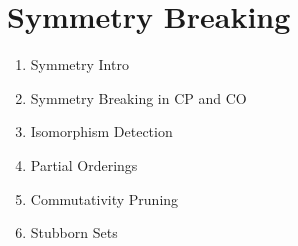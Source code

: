\section{Symmetry Breaking}
\label{cha::lit::symmetry}

\begin{enumerate}
\item{Symmetry Intro}
\item{Symmetry Breaking in CP and CO}
\item{Isomorphism Detection}
\item{Partial Orderings}
\item{Commutativity Pruning}
\item{Stubborn Sets}
\end{enumerate}

